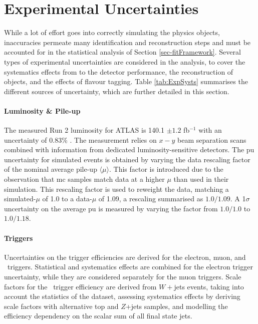 \section{Experimental Uncertainties}\label{sec-unc}
While a lot of effort goes into correctly simulating the physics objects, inaccuracies permeate many identification and reconstruction steps and must be accounted for in the statistical analysis of Section \ref{sec-fitFramework}. Several types of experimental uncertainties are considered in the analysis, to cover the systematics effects from to the detector performance, the reconstruction of objects, and the effects of flavour tagging. Table \ref{tab:ExpSysts} summarises the different sources of uncertainty, which are further detailed in this section.


\paragraph{Luminosity \& Pile-up} The measured Run 2 luminosity for ATLAS is 140.1 $\pm 1.2$ fb$^{-1}$ with an uncertainty of 0.83\% \cite{ATLAS:2022hro}. The measurement relies on $x-y$ beam separation scans combined with information from dedicated luminosity-sensitive detectors. The \gls{pu} uncertainty for simulated events is obtained by varying the data rescaling factor of the nominal average pile-up $\langle \mu \rangle$. This factor is introduced due to the observation that \gls{mc} samples match data at a higher $\mu$ than used in their simulation. This rescaling factor is used to reweight the data, matching a simulated-$\mu$ of 1.0 to a data-$\mu$ of 1.09, a rescaling summarised as $1.0/1.09$. A 1$\sigma$ uncertainty on the average \gls{pu} is measured by varying the factor from $1.0/1.0$ to $1.0/1.18$. %

\paragraph{Triggers} Uncertainties on the trigger efficiencies are derived for the electron, muon, and \etm\ triggers. Statistical and systematics effects are combined for the electron trigger uncertainty, while they are considered separately for the muon triggers. Scale factors for the \etm\ trigger efficiency are derived from $W+$jets events, taking into account the statistics of the dataset, assessing systematics effects by deriving scale factors with alternative top and $Z$+jets samples, and modelling the efficiency dependency on the scalar sum of all final state jets.

